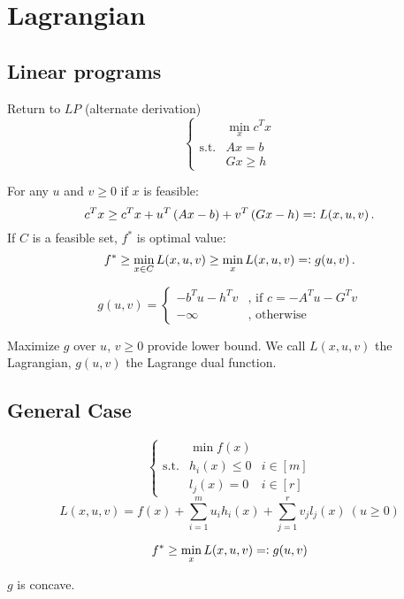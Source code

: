 \documentclass[10pt]{article}
\newcommand{\eqdef}{=\vcentcolon}
\begin{document}
\section{Lagrangian}
\subsection{Linear programs}
Return to $LP$ (alternate derivation)
\[
\left\{
\begin{array}{lll}
&\min\limits_xc^Tx\\
\text{s.t.} & Ax = b \\
& Gx \geq h
\end{array}
\right.
\]

For any $u$ and $v \geq 0$ if $x$ is feasible:
\[c^Tx \geq c^Tx+u^T\left(Ax-b\right)+v^T\left(Gx-h\right) \eqdef L(x, u, v)\,.\]
If $C$ is a feasible set, $f^*$ is optimal value:
\[f^* \geq \min\limits_{x \in C}L(x, u, v)\geq\min\limits_{x}L(x, u, v)\eqdef g(u, v)\,.\]

\[
g(u, v) = \left\{
	\begin{array}{ll}
	-b^Tu-h^Tv &\text{, if } c = -A^Tu-G^Tv \\
	-\infty &\text{, otherwise}
	\end{array}
\right.
\]

Maximize $g$ over $u$, $v \geq 0$ provide lower bound.
We call $L(x, u, v)$ the Lagrangian, $g(u, v)$ the Lagrange dual function.

\subsection{General Case}

\[
\left\{
\begin{array}{lll}
&\min{f(x)} \\
\text{s.t.} & h_i(x) \leq 0 & i \in [m] \\
& l_j(x) = 0 & i \in [r]
\end{array}
\right.
\]
\[L(x, u, v) = f(x) + \sum\limits_{i=1}^mu_ih_i(x)+\sum\limits_{j=1}^rv_jl_j(x)~\left(u \geq 0\right)\] 

\[f^* \geq \min_{x}{L(x, u, v)} \eqdef g(u, v)\]

$g$ is concave.
\end{document}
